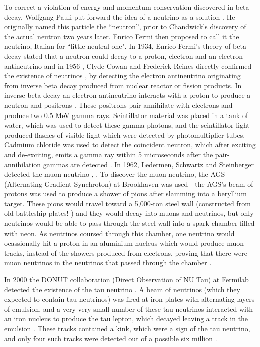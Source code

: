 To correct a violation of energy and momentum conservation discovered in beta-decay, Wolfgang Pauli put forward the idea of a neutrino as a solution \cite{brown_idea_1978}.  He originally named this particle the ``neutron'', prior to Chandwick's discovery of the actual neutron two years later.  Enrico Fermi then proposed to call it the neutrino, Italian for ``little neutral one". In 1934, Enrico Fermi's theory of beta decay stated that a neutron could decay to a proton, electron and an electron antineutrino \cite{bethe1934neutrino} and in 1956 \cite{luca_electroweak}, Clyde Cowan and Frederick Reines directly confirmed the existence of neutrinos \cite{cowan_reines}, by detecting the electron antineutrino originating from inverse beta decay produced from nuclear reactor or fission products. In inverse beta decay an electron antineutrino interacts with a proton to produce a neutron and positrons \cite{vogel1999angular}.
\newline
These positrons pair-annihilate with electrons and produce two 0.5 MeV gamma rays. Scintillator material was placed in a tank of water, which was used to detect these gamma photons, and the scintillator light produced flashes of visible light which were detected by photomultiplier tubes. Cadmium chloride was used to detect the coincident neutron, which after exciting and de-exciting, emits a gamma ray within 5 microseconds after the pair-annihilation gammas are detected \cite{reines1956neutrino}. In 1962, Ledermen, Schwartz and Steinberger detected the muon neutrino \cite{feinberg1963physics}, \cite{lederman_schwartz}. To discover the muon neutrino, the AGS (Alternating Gradient Synchroton) at Brookhaven \cite{courant1958theory} was used - the AGS's beam of protons was used to produce a shower of pions after slamming into a beryllium target. These pions would travel toward a 5,000-ton steel wall (constructed from old battleship plates! \cite{ricoux2010search}) and they would decay into muons and neutrinos, but only neutrinos would be able to pass through the steel wall into a spark chamber filled with neon. As neutrinos coursed through this chamber, one neutrino would ocassionally hit a proton in an aluminium nucleus which would produce muon tracks, instead of the showers produced from electrons, proving that there were muon neutrinos in the neutrinos that passed through the chamber \cite{lindley2015landmarks}. 
\newline

In 2000 the DONUT collaboration (Direct Observation of NU Tau) at Fermilab detected the existence of the tau neutrino \cite{kodama2001observation}. A beam of neutrinos (which they expected to contain tau neutrinos) was fired at iron plates with alternating layers of emulsion, and a very very small number of these tau neutrinos interacted with an iron nucleus to produce the tau lepton, which decayed leaving a track in the emulsion \cite{kodama2004identification}. These tracks contained a kink, which were a sign of the tau neutrino, and only four such tracks were detected out of a possible six million \cite{kodama1993muon}.

